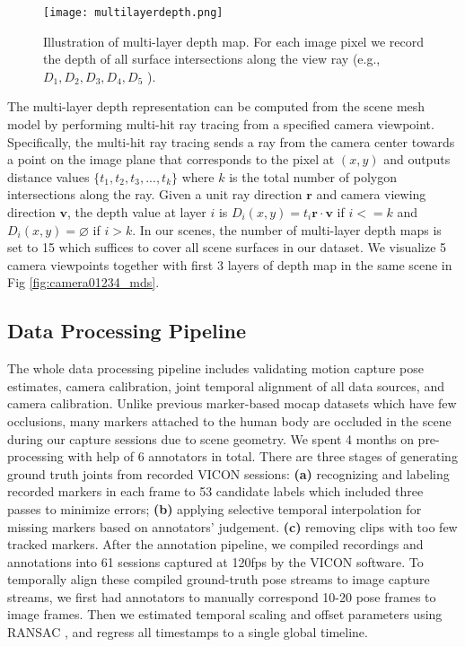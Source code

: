 \documentclass[times,referee,twocolumn,final,authoryear]{elsarticle}
\begin{document}
\begin{figure}
\begin{center}
   \texttt{[image: multilayerdepth.png]}
\end{center}
   \caption{Illustration of multi-layer depth map. For each image pixel we record the 
   depth of all surface intersections along the view ray (e.g., $D_1, D_2, D_3, D_4, D_5$ ).} 
\label{fig:multilayer}
\end{figure}

The multi-layer depth representation can be computed from the scene mesh model by 
performing multi-hit ray tracing from a specified camera viewpoint. Specifically, the 
multi-hit ray tracing sends a ray from the camera center towards a point on the 
image plane that corresponds to the pixel at $(x, y)$ and outputs distance
values $\{t_1, t_2, t_3, ..., t_k\}$ where $k$ is the total number of
polygon intersections along the ray.  Given a unit ray direction $\mathbf{r}$ and
camera viewing direction $\mathbf{v}$, the depth value at layer $i$ is $D_i(x, y) =
t_i\mathbf{r}\cdot\mathbf{v}$ if $i <= k$ and $D_i(x, y) = \varnothing$ if $i >
k$. In our scenes, the number of multi-layer depth maps is set to 15 which suffices
to cover all scene surfaces in our dataset. We visualize 5 camera viewpoints together 
with first 3 layers of depth map in the same scene in Fig \ref{fig:camera01234_mds}.

\subsection{Data Processing Pipeline}
The whole data processing pipeline includes validating motion capture pose
estimates, camera calibration, joint temporal alignment of all data  sources,
and camera calibration.
Unlike previous marker-based mocap datasets which have few occlusions, many markers
attached to the human body are occluded in the scene during our capture
sessions due to scene geometry. We spent 4 months on pre-processing with help of 6 
annotators in total.  There are three stages of generating ground truth joints from 
recorded VICON sessions: \textbf{(a)} recognizing and labeling recorded markers in each
frame to 53 candidate labels which included three passes to minimize errors;
\textbf{(b)} applying selective temporal interpolation for missing markers
based on annotators' judgement. \textbf{(c)} removing clips with too few
tracked markers. After the annotation pipeline, we compiled recordings and
annotations into 61 sessions captured at 120fps by the VICON software. To
temporally align these compiled ground-truth pose streams to image capture
streams, we first had annotators to manually correspond 10-20 pose
frames to image frames. Then we estimated temporal scaling and offset 
parameters using RANSAC \cite{fischler1981random}, and regress all timestamps 
to a single global timeline. 
\end{document}
